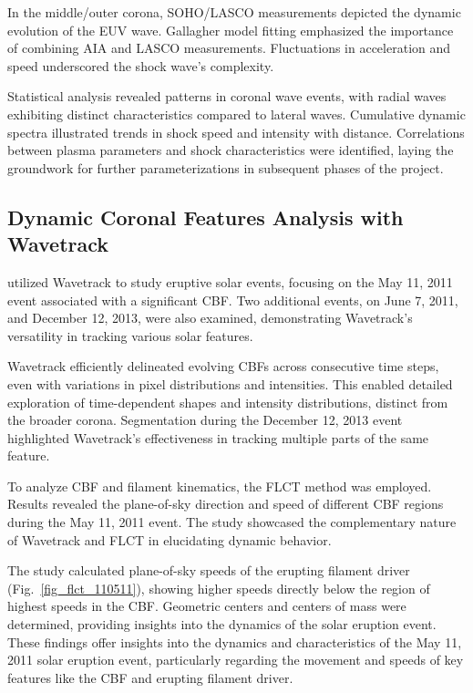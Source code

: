 In the middle/outer corona, SOHO/LASCO measurements depicted the dynamic evolution of the EUV wave. Gallagher model fitting emphasized the importance of combining AIA and LASCO measurements. Fluctuations in acceleration and speed underscored the shock wave's complexity.

Statistical analysis revealed patterns in coronal wave events, with radial waves exhibiting distinct characteristics compared to lateral waves. Cumulative dynamic spectra illustrated trends in shock speed and intensity with distance.
Correlations between plasma parameters and shock characteristics were identified, laying the groundwork for further parameterizations in subsequent phases of the project.

\subsection{Dynamic Coronal Features Analysis with Wavetrack}
\citet{stepanyuk_2022} utilized Wavetrack to study eruptive solar events, focusing on the May 11, 2011 event associated with a significant CBF. Two additional events, on June 7, 2011, and December 12, 2013, were also examined, demonstrating Wavetrack's versatility in tracking various solar features.

Wavetrack efficiently delineated evolving CBFs across consecutive time steps, even with variations in pixel distributions and intensities. This enabled detailed exploration of time-dependent shapes and intensity distributions, distinct from the broader corona. Segmentation during the December 12, 2013 event highlighted Wavetrack's effectiveness in tracking multiple parts of the same feature.

To analyze CBF and filament kinematics, the FLCT method was employed. Results revealed the plane-of-sky direction and speed of different CBF regions during the May 11, 2011 event. The study showcased the complementary nature of Wavetrack and FLCT in elucidating dynamic behavior.

The study calculated plane-of-sky speeds of the erupting filament driver (Fig.~\ref{fig_flct_110511}), showing higher speeds directly below the region of highest speeds in the CBF. Geometric centers and centers of mass were determined, providing insights into the dynamics of the solar eruption event.
These findings offer insights into the dynamics and characteristics of the May 11, 2011 solar eruption event, particularly regarding the movement and speeds of key features like the CBF and erupting filament driver.

